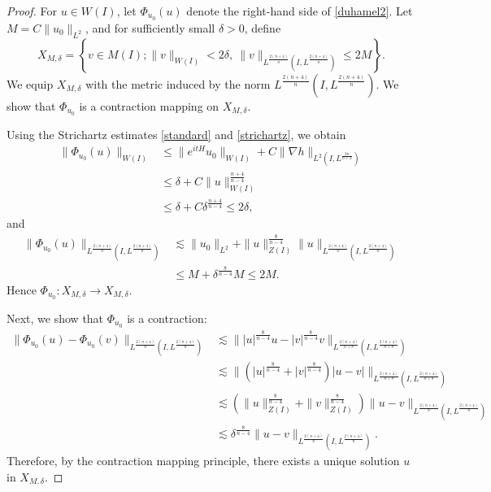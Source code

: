 \documentclass[11pt,a4paper]{article}
\numberwithin{equation}{section}
\begin{document}
\begin{proof}
For $u \in W(I)$, let $\Phi_{u_{0}}(u)$ denote the right-hand side of \eqref{duhamel2}. Let $M = C\|u_{0}\|_{L^{2}}$, and for sufficiently small $\delta > 0$, define
\[
X_{M, \delta} = \left\{ v \in M(I) ; \|v\|_{W(I)} < 2\delta,\ \|v\|_{L^{\frac{2(n + 4)}{n}}(I, L^{\frac{2(n + 4)}{n}})} \leq 2M \right\}.
\]
We equip $X_{M, \delta}$ with the metric induced by the norm
$L^{\frac{2(n + 4)}{n}}(I, L^{\frac{2(n + 4)}{n}})$.
We show that $\Phi_{u_{0}}$ is a contraction mapping on $X_{M, \delta}$.

Using the Strichartz estimates \eqref{standard} and \eqref{strichartz}, we obtain
\begin{align*}
\|\Phi_{u_{0}}(u)\|_{W(I)}
&\leq \|e^{itH}u_{0}\|_{W(I)} + C\|\nabla h\|_{L^{2}(I, L^{\frac{2n}{n + 2}})} \\
&\leq \delta + C\|u\|_{W(I)}^{\frac{n+4}{n-4}} \\
&\leq \delta + C\delta^{\frac{n+4}{n-4}} \leq 2\delta,
\end{align*}
and
\begin{align*}
\|\Phi_{u_{0}}(u)\|_{L^{\frac{2(n + 4)}{n}}(I, L^{\frac{2(n + 4)}{n}})}
&\lesssim \|u_{0}\|_{L^{2}} + \|u\|_{Z(I)}^{\frac{8}{n-4}} \|u\|_{L^{\frac{2(n + 4)}{n}}(I, L^{\frac{2(n + 4)}{n}})} \\
&\leq M + \delta^{\frac{8}{n - 4}}M \leq 2M.
\end{align*}
Hence $\Phi_{u_{0}} : X_{M, \delta} \to X_{M, \delta}$.

Next, we show that $\Phi_{u_{0}}$ is a contraction:
\begin{align*}
\|\Phi_{u_{0}}(u) - \Phi_{u_{0}}(v)\|_{L^{\frac{2(n + 4)}{n}}(I, L^{\frac{2(n + 4)}{n}})}
&\lesssim \| |u|^{\frac{8}{n-4}}u - |v|^{\frac{8}{n-4}}v \|_{L^{\frac{2(n + 4)}{n + 8}}(I, L^{\frac{2(n + 4)}{n + 8}})} \\
&\lesssim \| (|u|^{\frac{8}{n-4}} + |v|^{\frac{8}{n-4}} ) | u - v | \|_{L^{\frac{2(n + 4)}{n + 8}}(I, L^{\frac{2(n + 4)}{n + 8}})} \\
&\lesssim (\|u\|_{Z(I)}^{\frac{8}{n-4}} + \|v\|_{Z(I)}^{\frac{8}{n-4}})\|u - v \|_{L^{\frac{2(n + 4)}{n}}(I, L^{\frac{2(n + 4)}{n}})} \\
&\lesssim \delta^{\frac{8}{n-4}}\|u - v\|_{L^{\frac{2(n + 4)}{n}}(I, L^{\frac{2(n + 4)}{n}})}.
\end{align*}
Therefore, by the contraction mapping principle, there exists a unique solution $u$ in $X_{M,\delta}$.


\end{proof}
\end{document}
